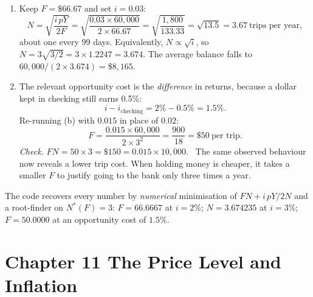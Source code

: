\documentclass[12pt, letterpaper]{article}
\begin{document}
\begin{tcolorbox}[oddbox,title={Problem 10.5 \quad Going to the Bank}]
\begin{enumerate}
\item Keep $F=\$66.67$ and set $i=0.03$:
\[
N=\sqrt{\frac{i\,pY}{2F}}=\sqrt{\frac{0.03\times60{,}000}{2\times66.67}}
=\sqrt{\frac{1{,}800}{133.33}}=\sqrt{13.5}=\boxed{3.67\ \text{trips per year}},
\]
about one every 99 days. Equivalently, $N\propto\sqrt i$, so $N=3\sqrt{3/2}=3\times1.2247=3.674$.
The average balance falls to $60{,}000/(2\times3.674)=\$8{,}165$.

\item The relevant opportunity cost is the \emph{difference} in returns, because a dollar kept
in checking still earns 0.5\%:
\[
\boxed{i-i_{\text{checking}}=2\%-0.5\%=1.5\%.}
\]
Re-running (b) with $0.015$ in place of $0.02$:
\[
F=\frac{0.015\times60{,}000}{2\times3^2}=\frac{900}{18}=\boxed{\$50\ \text{per trip}}.
\]
\emph{Check.} $FN=50\times3=\$150=0.015\times10{,}000$. \checkmark\ The same observed
behaviour now reveals a lower trip cost. When holding money is cheaper, it takes a smaller
$F$ to justify going to the bank only three times a year.
\end{enumerate}

\begin{tcolorbox}[databox]
The code recovers every number by \emph{numerical} minimisation of $FN+i\,pY/2N$ and a
root-finder on $N^\ast(F)=3$: $F=66.6667$ at $i=2\%$; $N=3.674235$ at $i=3\%$; $F=50.0000$ at
an opportunity cost of $1.5\%$.
\end{tcolorbox}
\end{tcolorbox}

\section{Chapter 11 \quad The Price Level and Inflation}
\end{document}
